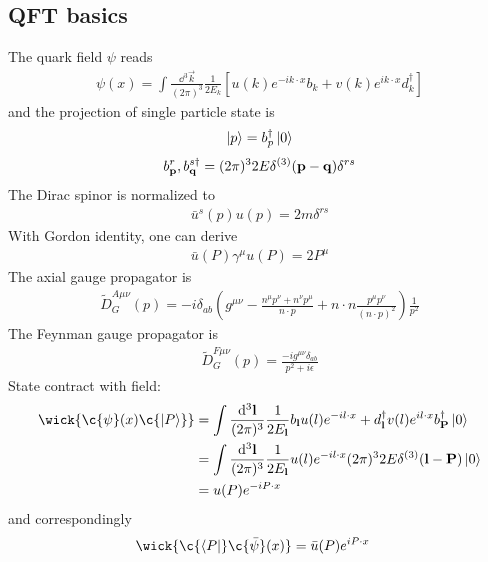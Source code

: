 \documentclass{article}
\DeclarePairedDelimiter\BraceM\{\}
\DeclarePairedDelimiter\bracketM{[}{]}
\let\Bqty\relax
\let\bqty\relax
\newcommand{\Bqty}[1]{\BraceM*{#1}}
\newcommand{\bqty}[1]{\bracketM*{#1}}
\newcommand{\mme}[1]{\frac{\dd^3\vb{#1}}{(2\pi)^3}}
\begin{document}
\subsection{QFT basics}
The quark field $\psi$ reads
\begin{align}
	\psi(x)=\int \frac{\dd^{3} \vec{k}}{(2 \pi)^{3}} \frac{1}{2 E_{k}}\left[u(k) e^{-i k \cdot x} b_{k}+v(k)e^{ik\cdot x} d_{k}^{\dagger}\right]
\end{align}
and the projection of single particle state is
\begin{align}
	\ket{p}=b_p^{\dagger}\ket{0}
\end{align}
\begin{align}
	\Bqty{b_{\vb{p}}^r,b_{\vb{q}}^{s\dagger}}=(2\pi)^32E\delta^{(3)}(\vb{p}-\vb{q})\delta^{rs}
\end{align}
The Dirac spinor is normalized to
\begin{align}
	\bar u^s(p) u(p)=2m\delta^{rs}
\end{align}
With Gordon identity, one can derive\cite{Srednicki2007}
\begin{align}
	\bar u(P) \gamma^\mu u(P) =2P^\mu
\end{align}
The axial gauge propagator is
\begin{align}
	\tilde D_G^{A\mu\nu}(p)=-i \delta_{a b}\left(g^{\mu \nu}-\frac{n^{\mu} p^{\nu}+n^{\nu} p^{\mu}}{n \cdot p}+n \cdot n \frac{p^{\mu} p^{\nu}}{(n \cdot p)^{2}}\right) \frac{1}{p^{2}}
\end{align}
The Feynman gauge propagator is
\begin{align}
	\tilde D_G^{F\mu\nu}(p)= \frac{-i g^{\mu\nu} \delta_{a b}}{p^{2}+i\epsilon}
\end{align}
State contract with field:
\begin{align}
	\wick{\c{\psi}(x)\c{\ket{P}}} & =\int\mme{l}\frac{1}{2E_{\vb{l}}}\bqty{b_{\vb{l}}u(l)e^{-il\cdot x}+d_{\vb{l}}^{\dagger}v(l)e^{il\cdot x}}b_{\vb{P}}^{\dagger}\ket{0}\notag \\
	                              & =\int\mme{l}\frac{1}{2E_{\vb{l}}}u(l)e^{-il\cdot x}(2\pi)^32E\delta^{(3)}(\vb{l}-\vb{P})\ket{0}\notag                                       \\
	                              & =u(P)e^{-iP\cdot x}
\end{align}
and correspondingly
\begin{align}
	\wick{\c{\bra{P}}\c{\bar\psi}(x)} & =\bar u(P)e^{iP\cdot x}
\end{align}
\end{document}
